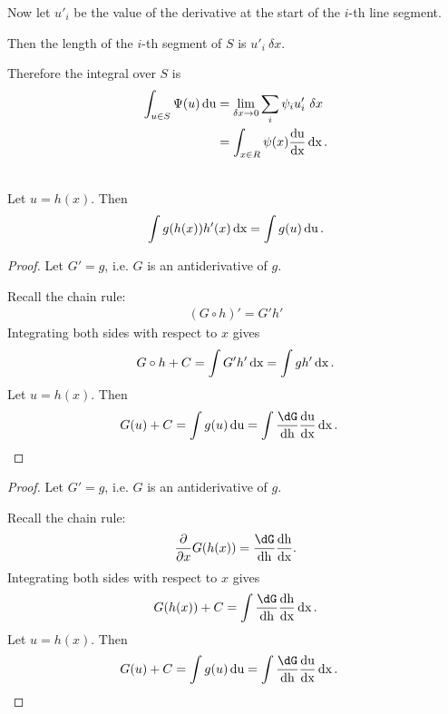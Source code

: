 Now let $u'_i$ be the value of the derivative at the start of the $i$-th line segment.

Then the length of the $i$-th segment of $S$ is $u'_i ~\delta x$.

Therefore the integral over $S$ is
\begin{align*}
  \int_{u \in S} \Psi(u) \operatorname{\text{du}} &= \lim_{\delta x \to 0} \sum_i \psi_iu'_i~\delta x\\
                            &= \int_{x \in R} \psi(x)\frac{\operatorname{\text{du}}}{\operatorname{\text{dx}}}\operatorname{\text{dx}}.
\end{align*}

\newpage
\begin{theorem*}~\\
  Let $u = h(x)$. Then
  \begin{align*}
    \int g(h(x))h'(x) \operatorname{\text{dx}} = \int g(u) \operatorname{\text{du}}.
  \end{align*}
\end{theorem*}

\begin{proof}
  Let $G' = g$, i.e. $G$ is an antiderivative of $g$.

  Recall the chain rule:
  \begin{align*}
    (G \circ h)' = G' h'
  \end{align*}
  Integrating both sides with respect to $x$ gives
  \begin{align*}
    G \circ h + C = \int G' h' \operatorname{\text{dx}} = \int g h' \operatorname{\text{dx}}.
  \end{align*}
  Let $u = h(x)$. Then
  \begin{align*}
    G(u) + C &= \int g(u) \du
              = \int \frac{\dG}{\dh} \frac{\du}{\dx} \dx.
  \end{align*}
\end{proof}

\begin{proof}
  Let $G' = g$, i.e. $G$ is an antiderivative of $g$.

  Recall the chain rule:
  \begin{align*}
    \ddx G(h(x)) = \frac{\dG}{\dh} \frac{\dh}{\dx}.
  \end{align*}
  Integrating both sides with respect to $x$ gives
  \begin{align*}
    G(h(x)) + C = \int \frac{\dG}{\dh} \frac{\dh}{\dx} \dx.
  \end{align*}
  Let $u = h(x)$. Then
  \begin{align*}
    G(u) + C &= \int g(u) \du
              = \int \frac{\dG}{\dh} \frac{\du}{\dx} \dx.
  \end{align*}
\end{proof}

